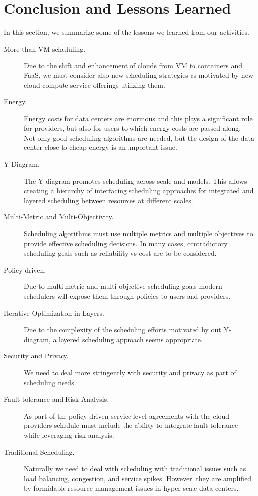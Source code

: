 \documentclass[final,5p,times,twocolumn]{elsarticle}
\begin{document}
\section{Conclusion and Lessons Learned}\label{sec:conclusion}



In this section, we summarize some of the lessons we learned from our activities.

\begin{description}

\item[More than VM scheduling.] Due to the shift and enhancement of clouds from VM to containers and FaaS, we must consider also new scheduling strategies as motivated by new cloud compute service offerings utilizing them.

\item[Energy.] Energy costs for data centers are enormous and this plays a significant role for providers, but also for users to which energy costs are passed along. Not only good scheduling algorithms are needed, but the design of the data center close to cheap energy is an important issue.

\item[Y-Diagram.] The Y-diagram promotes scheduling across scale and models. This allows creating a hierarchy of interfacing scheduling approaches for integrated and layered scheduling between resources at different scales.

\item[Multi-Metric and Multi-Objectivity.] Scheduling algorithms must use multiple metrics and multiple objectives to provide effective scheduling decisions. In many cases, contradictory scheduling goals such as reliability vs cost are to be considered.

\item[Policy driven.] Due to multi-metric and multi-objective scheduling goals modern schedulers will expose them through policies to users and providers.

\item[Iterative Optimization in Layers.] Due to the complexity of the scheduling efforts motivated by out Y-diagram, a layered scheduling approach seems appropriate.

\item[Security and Privacy.] We need to deal more stringently with security and privacy as part of scheduling needs.

\item[Fault tolerance and Risk Analysis.] As part of the policy-driven service level agreements with the cloud providers schedule must include the ability to integrate fault tolerance while leveraging risk analysis.

\item[Traditional Scheduling.] Naturally we need to deal with scheduling with traditional issues such as load balancing, congestion, and service spikes. However, they are amplified by formidable resource management issues in hyper-scale data centers.



\end{description}
\end{document}
